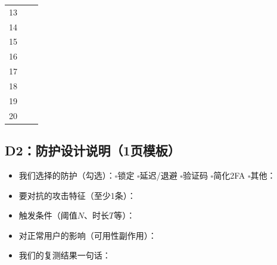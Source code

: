 \documentclass[UTF8,a4paper,12pt]{ctexart}
\begin{document}
\begin{longtable}{@{}p{}p{}p{}@{}}
13 & \underline{\hspace{16em}} & \underline{\hspace{18em}} \\
14 & \underline{\hspace{16em}} & \underline{\hspace{18em}} \\
15 & \underline{\hspace{16em}} & \underline{\hspace{18em}} \\
16 & \underline{\hspace{16em}} & \underline{\hspace{18em}} \\
17 & \underline{\hspace{16em}} & \underline{\hspace{18em}} \\
18 & \underline{\hspace{16em}} & \underline{\hspace{18em}} \\
19 & \underline{\hspace{16em}} & \underline{\hspace{18em}} \\
20 & \underline{\hspace{16em}} & \underline{\hspace{18em}} \\
\bottomrule
\end{longtable}

\subsection*{D2：防护设计说明（1页模板）}
\begin{itemize}
  \item 我们选择的防护（勾选）：$\square$锁定 $\square$延迟/退避 $\square$验证码 $\square$简化2FA $\square$其他：\underline{\hspace{10em}}
  \item 要对抗的攻击特征（至少1条）：\underline{\hspace{24em}}
  \item 触发条件（阈值$N$、时长$T$等）：\underline{\hspace{24em}}
  \item 对正常用户的影响（可用性副作用）：\underline{\hspace{24em}}
  \item 我们的复测结果一句话：\underline{\hspace{24em}}
\end{itemize}
\end{document}
